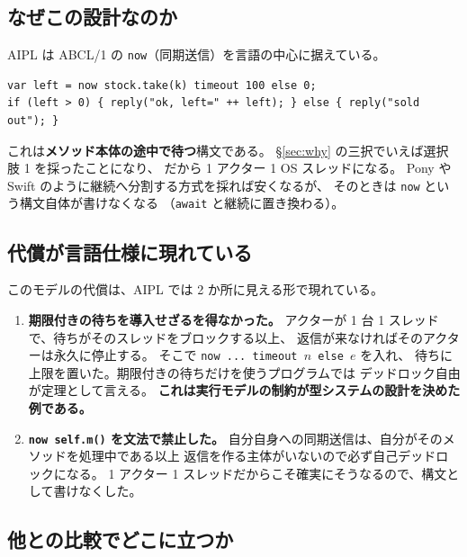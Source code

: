 \documentclass[11pt,a4paper]{ltjsarticle}
\begin{document}
\subsection{なぜこの設計なのか}

AIPL は ABCL/1 の \texttt{now}（同期送信）を言語の中心に据えている。

\begin{lstlisting}[language={}]
var left = now stock.take(k) timeout 100 else 0;
if (left > 0) { reply("ok, left=" ++ left); } else { reply("sold out"); }
\end{lstlisting}

これは\textbf{メソッド本体の途中で待つ}構文である。
\S\ref{sec:why} の三択でいえば選択肢 1 を採ったことになり、
だから 1 アクター 1 OS スレッドになる。
Pony や Swift のように継続へ分割する方式を採れば安くなるが、
そのときは \texttt{now} という構文自体が書けなくなる
（\texttt{await} と継続に置き換わる）。

\subsection{代償が言語仕様に現れている}

このモデルの代償は、AIPL では 2 か所に見える形で現れている。

\begin{enumerate}
\item \textbf{期限付きの待ちを導入せざるを得なかった。}
  アクターが 1 台 1 スレッドで、待ちがそのスレッドをブロックする以上、
  返信が来なければそのアクターは永久に停止する。
  そこで \texttt{now ... timeout $n$ else $e$} を入れ、
  待ちに上限を置いた。期限付きの待ちだけを使うプログラムでは
  デッドロック自由が定理として言える。
  \textbf{これは実行モデルの制約が型システムの設計を決めた例である。}
\item \textbf{\texttt{now self.m()} を文法で禁止した。}
  自分自身への同期送信は、自分がそのメソッドを処理中である以上
  返信を作る主体がいないので必ず自己デッドロックになる。
  1 アクター 1 スレッドだからこそ確実にそうなるので、構文として書けなくした。
\end{enumerate}

\subsection{他との比較でどこに立つか}
\end{document}
